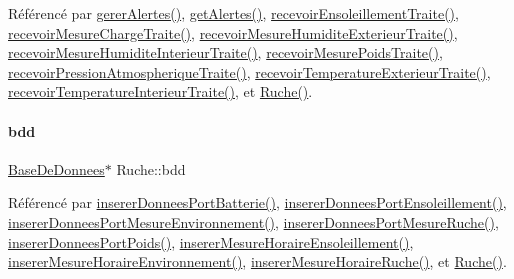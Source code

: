 Référencé par \hyperlink{class_ruche_a80f3538f081aea887d7199f114dfca01}{gerer\+Alertes()}, \hyperlink{class_ruche_a9edbc2e81ccb2cb76de43639bcb16ec1}{get\+Alertes()}, \hyperlink{class_ruche_a581320fbd44c1752d10aa0e6e533863c}{recevoir\+Ensoleillement\+Traite()}, \hyperlink{class_ruche_a4ad540139115b79cd52336ad1a11453c}{recevoir\+Mesure\+Charge\+Traite()}, \hyperlink{class_ruche_a2d19d8438eae55c1d76691398087f079}{recevoir\+Mesure\+Humidite\+Exterieur\+Traite()}, \hyperlink{class_ruche_aab8b4958b32aad9af790963903e4788e}{recevoir\+Mesure\+Humidite\+Interieur\+Traite()}, \hyperlink{class_ruche_afd8b0d7512f325327704cd3e37091dc2}{recevoir\+Mesure\+Poids\+Traite()}, \hyperlink{class_ruche_a3b43ce547e616ee0b14e3a0e0aa44a4d}{recevoir\+Pression\+Atmospherique\+Traite()}, \hyperlink{class_ruche_a1d9b1d3aad20f206f27de4093b4a136f}{recevoir\+Temperature\+Exterieur\+Traite()}, \hyperlink{class_ruche_a3a5934e6da843c959f34aecef1217f92}{recevoir\+Temperature\+Interieur\+Traite()}, et \hyperlink{class_ruche_a8b4ee3752d984c5acee93b990db7939a}{Ruche()}.

\mbox{\label{class_ruche_a8577fdedabdecd98652e338e83bb3b65}} 
\paragraph{\texorpdfstring{bdd}{bdd}}
{\footnotesize\ttfamily \hyperlink{class_base_de_donnees}{Base\+De\+Donnees}$\ast$ Ruche\+::bdd\hspace{0.3cm}{\ttfamily [private]}}



Référencé par \hyperlink{class_ruche_a509367d6b2bcb7e6431fc1cc5ff606b5}{inserer\+Donnees\+Port\+Batterie()}, \hyperlink{class_ruche_ad21de5f7d48195be0658f52c55f34183}{inserer\+Donnees\+Port\+Ensoleillement()}, \hyperlink{class_ruche_a46c0f440f40a5125f2d579b481660457}{inserer\+Donnees\+Port\+Mesure\+Environnement()}, \hyperlink{class_ruche_aa61f6dd8b15e5242ef3a3bdd87cca4a3}{inserer\+Donnees\+Port\+Mesure\+Ruche()}, \hyperlink{class_ruche_a923f42fc4878a01f6102966a748e8f37}{inserer\+Donnees\+Port\+Poids()}, \hyperlink{class_ruche_a658234b9d96541d204b95b74556742b6}{inserer\+Mesure\+Horaire\+Ensoleillement()}, \hyperlink{class_ruche_ac52e79446c5629645e02e27d2a01e56c}{inserer\+Mesure\+Horaire\+Environnement()}, \hyperlink{class_ruche_a3a093c088d9c97f347394c8a681f7302}{inserer\+Mesure\+Horaire\+Ruche()}, et \hyperlink{class_ruche_a8b4ee3752d984c5acee93b990db7939a}{Ruche()}.

